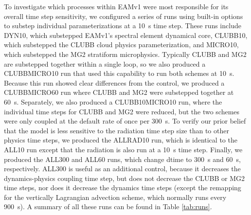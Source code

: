 \documentclass [11pt, proquest] {uwthesis}[2020/02/24]
\begin{document}
To investigate which processes within EAMv1 were most responsible for its overall time step sensitivity, we configured a series of runs using built-in options to substep individual parameterizations at a \SI{10}{\second} time step. These runs include DYN10, which substepped EAMv1's spectral element dynamical core, CLUBB10, which substepped the CLUBB cloud physics parameterization, and MICRO10, which substepped the MG2 stratiform microphysics. Typically CLUBB and MG2 are substepped together within a single loop, so we also produced a CLUBBMICRO10 run that used this capability to run both schemes at \SI{10}{\second}. Because this run showed clear differences from the control, we produced a CLUBBMICRO60 run where CLUBB and MG2 were substepped together at \SI{60}{\second}. Separately, we also produced a CLUBB10MICRO10 run, where the individual time steps for CLUBB and MG2 were reduced, but the two schemes were only coupled at the default rate of once per \SI{300}{\second}. To verify our prior belief that the model is less sensitive to the radiation time step size than to other physics time steps, we produced the ALLRAD10 run, which is identical to the ALL10 run except that the radiation is also run at a \SI{10}{\second} time step. Finally, we produced the ALL300 and ALL60 runs, which change dtime to \SI{300}{\second} and \SI{60}{\second}, respectively. ALL300 is useful as an additional control, because it decreases the dynamics-physics coupling time step, but does not decrease the CLUBB or MG2 time steps, nor does it decrease the dynamics time steps (except the remapping for the vertically Lagrangian advection scheme, which normally runs every \SI{900}{\second}). A summary of all these runs can be found in Table \ref{tab:runs}.
\end{document}
